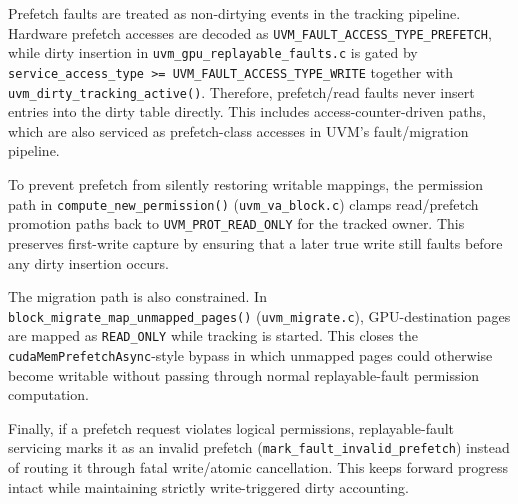 Prefetch faults are treated as non-dirtying events in the tracking pipeline.
Hardware prefetch accesses are decoded as
\texttt{UVM\_FAULT\_ACCESS\_TYPE\_PREFETCH}, while dirty insertion in
\texttt{uvm\_gpu\_replayable\_faults.c} is gated by
\texttt{service\_access\_type >= UVM\_FAULT\_ACCESS\_TYPE\_WRITE} together
with \texttt{uvm\_dirty\_tracking\_active()}. Therefore, prefetch/read faults
never insert entries into the dirty table directly.
This includes access-counter-driven paths, which are also serviced as
prefetch-class accesses in UVM's fault/migration pipeline.

To prevent prefetch from silently restoring writable mappings, the permission
path in \texttt{compute\_new\_permission()} (\texttt{uvm\_va\_block.c}) clamps
read/prefetch promotion paths back to \texttt{UVM\_PROT\_READ\_ONLY} for the
tracked owner. This preserves first-write capture by ensuring that a later true
write still faults before any dirty insertion occurs.

The migration path is also constrained. In
\texttt{block\_migrate\_map\_unmapped\_pages()} (\texttt{uvm\_migrate.c}),
GPU-destination pages are mapped as \texttt{READ\_ONLY} while tracking is
started. This closes the \texttt{cudaMemPrefetchAsync}-style bypass in which
unmapped pages could otherwise become writable without passing through normal
replayable-fault permission computation.

Finally, if a prefetch request violates logical permissions, replayable-fault
servicing marks it as an invalid prefetch
(\texttt{mark\_fault\_invalid\_prefetch}) instead of routing it through fatal
write/atomic cancellation. This keeps forward progress intact while maintaining
strictly write-triggered dirty accounting.
